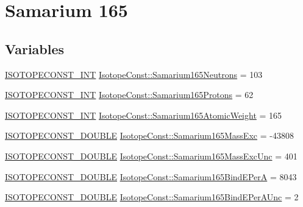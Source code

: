 \hypertarget{group___isotope_const-_samarium-_sm165}{}\section{Samarium 165}
\label{group___isotope_const-_samarium-_sm165}
\subsection*{Variables}
\begin{DoxyCompactItemize}
\item 
\mbox{\hyperlink{group___isotope_const-_macros_ga5f18360b3e99483a35c32d789e62621c}{I\+S\+O\+T\+O\+P\+E\+C\+O\+N\+S\+T\+\_\+\+I\+NT}} \mbox{\hyperlink{group___isotope_const-_samarium-_sm165_ga0e69184dbf4c051c1270ec7455664c93}{Isotope\+Const\+::\+Samarium165\+Neutrons}} = 103
\item 
\mbox{\hyperlink{group___isotope_const-_macros_ga5f18360b3e99483a35c32d789e62621c}{I\+S\+O\+T\+O\+P\+E\+C\+O\+N\+S\+T\+\_\+\+I\+NT}} \mbox{\hyperlink{group___isotope_const-_samarium-_sm165_ga2b02df0fa176a73706e1dd4ca63b0881}{Isotope\+Const\+::\+Samarium165\+Protons}} = 62
\item 
\mbox{\hyperlink{group___isotope_const-_macros_ga5f18360b3e99483a35c32d789e62621c}{I\+S\+O\+T\+O\+P\+E\+C\+O\+N\+S\+T\+\_\+\+I\+NT}} \mbox{\hyperlink{group___isotope_const-_samarium-_sm165_ga084904cf9fe68da9266b1e71279a8bc1}{Isotope\+Const\+::\+Samarium165\+Atomic\+Weight}} = 165
\item 
\mbox{\hyperlink{group___isotope_const-_macros_ga8f45a7272ce02c0b4c65c44636ed719a}{I\+S\+O\+T\+O\+P\+E\+C\+O\+N\+S\+T\+\_\+\+D\+O\+U\+B\+LE}} \mbox{\hyperlink{group___isotope_const-_samarium-_sm165_ga8c3fcd39b6f4840342743a3af3fdf3eb}{Isotope\+Const\+::\+Samarium165\+Mass\+Exc}} = -\/43808
\item 
\mbox{\hyperlink{group___isotope_const-_macros_ga8f45a7272ce02c0b4c65c44636ed719a}{I\+S\+O\+T\+O\+P\+E\+C\+O\+N\+S\+T\+\_\+\+D\+O\+U\+B\+LE}} \mbox{\hyperlink{group___isotope_const-_samarium-_sm165_ga966de0a334cc7612b5cf17aa6b1f110e}{Isotope\+Const\+::\+Samarium165\+Mass\+Exc\+Unc}} = 401
\item 
\mbox{\hyperlink{group___isotope_const-_macros_ga8f45a7272ce02c0b4c65c44636ed719a}{I\+S\+O\+T\+O\+P\+E\+C\+O\+N\+S\+T\+\_\+\+D\+O\+U\+B\+LE}} \mbox{\hyperlink{group___isotope_const-_samarium-_sm165_ga1cb5e7b454f99caa133795cb3462ea17}{Isotope\+Const\+::\+Samarium165\+Bind\+E\+PerA}} = 8043
\item 
\mbox{\hyperlink{group___isotope_const-_macros_ga8f45a7272ce02c0b4c65c44636ed719a}{I\+S\+O\+T\+O\+P\+E\+C\+O\+N\+S\+T\+\_\+\+D\+O\+U\+B\+LE}} \mbox{\hyperlink{group___isotope_const-_samarium-_sm165_ga927338e1b47c1a339e5f8edc6348e59f}{Isotope\+Const\+::\+Samarium165\+Bind\+E\+Per\+A\+Unc}} = 2

\end{DoxyCompactItemize}
